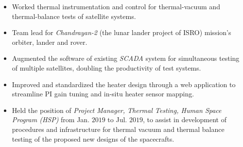 \documentclass[letterpaper,10pt]{article}
\begin{document}
\begin{itemize}[noitemsep,nolistsep,leftmargin=0.25in,label={--}]
    \item Worked thermal instrumentation and control for thermal-vacuum and thermal-balance tests of satellite systems.
	\item Team lead for \textit{Chandrayan-2} (the lunar lander project of ISRO) mission's orbiter, lander and rover.
    \item Augmented the software of existing \textit{SCADA} system for simultaneous testing of multiple satellites, doubling the productivity of test systems.
	\item Improved and standardized the heater design through a web application to streamline PI gain tuning and in-situ heater sensor mapping.
    \item Held the position of \textit{Project Manager, Thermal Testing, Human Space Program (HSP)} from Jan. $2019$ to Jul. $2019$, to assist in development of procedures and infrastructure for thermal vacuum and thermal balance testing of the proposed new designs of the spacecrafts.\\
\end{itemize}

\renewcommand\refname{Publications}
\nocite{improvBandwidth}


\end{document}
